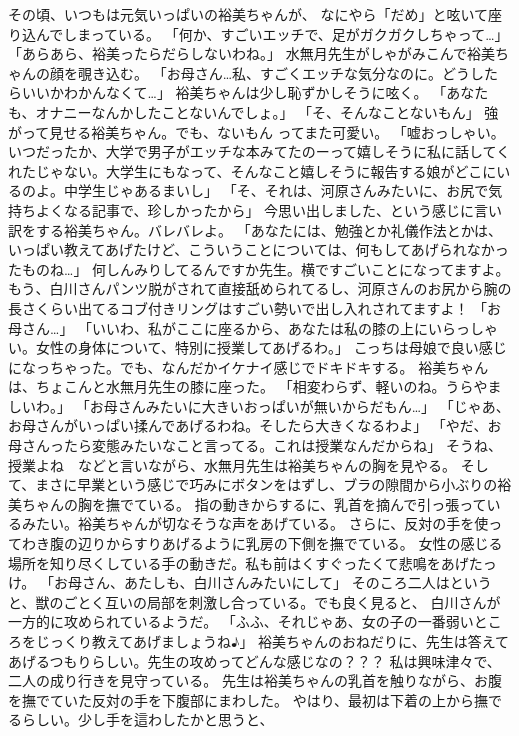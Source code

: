 その頃、いつもは元気いっぱいの裕美ちゃんが、
なにやら「だめ」と呟いて座り込んでしまっている。
「何か、すごいエッチで、足がガクガクしちゃって…」
「あらあら、裕美ったらだらしないわね。」
水無月先生がしゃがみこんで裕美ちゃんの顔を覗き込む。
「お母さん…私、すごくエッチな気分なのに。どうしたらいいかわかんなくて…」
裕美ちゃんは少し恥ずかしそうに呟く。
「あなたも、オナニーなんかしたことないんでしょ。」
「そ、そんなことないもん」
強がって見せる裕美ちゃん。でも、ないもん ってまた可愛い。
「嘘おっしゃい。いつだったか、大学で男子がエッチな本みてたのーって嬉しそうに私に話してくれたじゃない。大学生にもなって、そんなこと嬉しそうに報告する娘がどこにいるのよ。中学生じゃあるまいし」
「そ、それは、河原さんみたいに、お尻で気持ちよくなる記事で、珍しかったから」
今思い出しました、という感じに言い訳をする裕美ちゃん。バレバレよ。
「あなたには、勉強とか礼儀作法とかは、いっぱい教えてあげたけど、こういうことについては、何もしてあげられなかったものね…」
何しんみりしてるんですか先生。横ですごいことになってますよ。
もう、白川さんパンツ脱がされて直接舐められてるし、河原さんのお尻から腕の長さくらい出てるコブ付きリングはすごい勢いで出し入れされてますよ！
「お母さん…」
「いいわ、私がここに座るから、あなたは私の膝の上にいらっしゃい。女性の身体について、特別に授業してあげるわ。」
こっちは母娘で良い感じになっちゃった。でも、なんだかイケナイ感じでドキドキする。
裕美ちゃんは、ちょこんと水無月先生の膝に座った。
「相変わらず、軽いのね。うらやましいわ。」
「お母さんみたいに大きいおっぱいが無いからだもん…」
「じゃあ、お母さんがいっぱい揉んであげるわね。そしたら大きくなるわよ」
「やだ、お母さんったら変態みたいなこと言ってる。これは授業なんだからね」
そうね、授業よね　などと言いながら、水無月先生は裕美ちゃんの胸を見やる。
そして、まさに早業という感じで巧みにボタンをはずし、ブラの隙間から小ぶりの裕美ちゃんの胸を撫でている。
指の動きからするに、乳首を摘んで引っ張っているみたい。裕美ちゃんが切なそうな声をあげている。
さらに、反対の手を使ってわき腹の辺りからすりあげるように乳房の下側を撫でている。
女性の感じる場所を知り尽くしている手の動きだ。私も前はくすぐったくて悲鳴をあげたっけ。
「お母さん、あたしも、白川さんみたいにして」
そのころ二人はというと、獣のごとく互いの局部を刺激し合っている。でも良く見ると、
白川さんが一方的に攻められているようだ。
「ふふ、それじゃあ、女の子の一番弱いところをじっくり教えてあげましょうね♪」
裕美ちゃんのおねだりに、先生は答えてあげるつもりらしい。先生の攻めってどんな感じなの？？？
私は興味津々で、二人の成り行きを見守っている。
先生は裕美ちゃんの乳首を触りながら、お腹を撫でていた反対の手を下腹部にまわした。
やはり、最初は下着の上から撫でるらしい。少し手を這わしたかと思うと、
